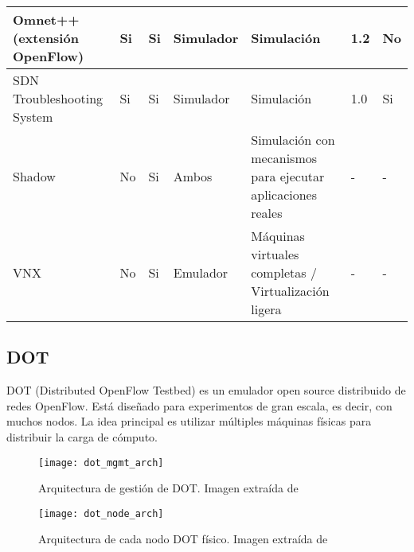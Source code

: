 \begin{table}
{\begin{tabular}{ | l | l | l | p{2.2cm} | p{4.0cm} | p{3.0cm} | p{2.8cm} |}
		Omnet++ (extensión OpenFlow) \cite{omnet-openflow} & Si & Si & Simulador & Simulación & 1.2 & No \\ \hline
		SDN Troubleshooting System \cite{sdn-troubleshooting-system} & Si & Si & Simulador & Simulación & 1.0 & Si \\ \hline
		Shadow \cite{shadow} & No & Si & Ambos & Simulación con mecanismos para ejecutar aplicaciones reales & - & - \\ \hline
		VNX \cite{vnx} & No & Si & Emulador & Máquinas virtuales completas / Virtualización ligera & - & - \\ \hline
	\end{tabular}}
	\label{table:emuladores-y-simuladores}
\end{table}

\subsection{DOT}
DOT (Distributed OpenFlow Testbed) \cite{dot} es un emulador open source distribuido de redes OpenFlow. Está diseñado para experimentos de gran escala, es decir, con muchos nodos. La idea principal es utilizar múltiples máquinas físicas para distribuir la carga de cómputo.

\begin{figure}[t]
	\caption{Arquitectura de gestión de DOT. Imagen extraída de \cite{dot}}
	\texttt{[image: dot\_mgmt\_arch]}
	\centering
	\label{fig:dot_mgmt_arch}
\end{figure}

\begin{figure}[t]
	\caption{Arquitectura de cada nodo DOT físico. Imagen extraída de \cite{dot}}
	\texttt{[image: dot\_node\_arch]}
	\centering
	\label{fig:dot_node_arch}
\end{figure}

